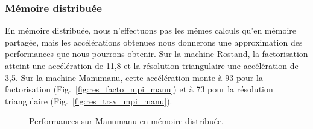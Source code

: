 \subsubsection{Mémoire distribuée}
En mémoire distribuée, nous n'effectuons pas les mêmes calculs qu'en mémoire partagée, mais les accélérations obtenues nous donnerons une approximation des performances que nous pourrons obtenir.
%
Sur la machine Rostand, la factorisation atteint une accélération de 11,8 et la résolution triangulaire une accélération de 3,5.
%
Sur la machine Manumanu, cette accélération monte à 93 pour la factorisation (Fig.~\ref{fig:res_facto_mpi_manu}) et à 73 pour la résolution triangulaire (Fig.~\ref{fig:res_trsv_mpi_manu}).


\begin{figure}[!ht]
     \begin{center}
    \end{center}
    \caption{Performances sur Manumanu en mémoire distribuée.}
\end{figure}
